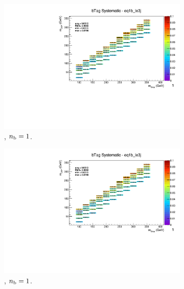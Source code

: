 \begin{figure}[ht!]
\begin{subfigure}[b]{0.32\textwidth}
    \includegraphics[width=\textwidth, page=8]{Figs/sms/t2cc/v37/systs/T2cc_bTag_eq1b_le3j.pdf}
    \caption{\njlow, $n_{\text{b}} = 1$.}
  \end{subfigure}
  \begin{subfigure}[b]{0.32\textwidth}
    \includegraphics[width=\textwidth, page=1]{Figs/sms/t2cc/v37/systs/T2cc_bTag_eq1b_le3j.pdf}
    \caption{\njlow, $n_{\text{b}} = 1$.}
    \label{fig:sms-btag-t2cc-le3j-1b}
  \end{subfigure}\\
  \begin{subfigure}[b]{0.32\textwidth}

\end{subfigure}
\end{figure}

